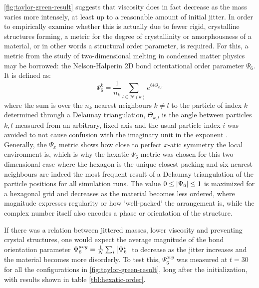 \begin{samepage}


  \autoref{fig:taylor-green-result} suggests that viscosity does in fact decrease as the mass varies more intensely, at least up to a reasonable amount of initial jitter.
  In order to empirically examine whether this is actually due to fewer rigid, crystalline structures forming, a metric for the degree of crystallinity or amorphousness of a material, or in other words a structural order parameter, is required. For this, a metric from the study of two-dimensional melting in condensed matter physics may be borrowed: the Nelson-Halperin 2D bond orientational order parameter\autocite*{bond-orientational-parameter-pis-6} $\Psi_6$. It is defined as\autocite{nature-psi-6-bond-orientational}:
  \begin{equation}
    \Psi_6^k = \frac{1}{n_k} \sum_{l\in\mathcal{N}(k)}e^{6i\Theta_{k,l}}
  \end{equation}
  where the sum is over the $n_k$ nearest neighbours $k\neq l$ to the particle of index $k$ determined through a Delaunay triangulation, $\Theta_{k,l}$ is the angle between particles $k,l$ measured from an arbitrary, fixed axis and the usual particle index $i$ was avoided to not cause confusion with the imaginary unit in the exponent \autocite*{nature-psi-6-bond-orientational}. Generally, the $\Psi_x$ metric shows how close to perfect $x$-atic symmetry the local environment is, which is why the hexatic $\Psi_6$ metric was chosen for this two-dimensional case where the hexagon is the unique closest packing and six nearest neighbours are indeed the most frequent result of a Delaunay triangulation of the particle positions for all simulation runs. The value $0 \leq \left|\Psi_6\right| \leq 1$ is maximized for a hexagonal grid and decreases as the material becomes less ordered\autocite*{nature-psi-6-bond-orientational}, where magnitude expresses regularity or how 'well-packed' the arrangement is\autocite*{nicer-psi-6-bond-orientational}, while the complex number itself also encodes a phase or orientation of the structure.

  If there was a relation between jittered masses, lower viscosity and preventing crystal structures, one would expect the average magnitude of the bond orientation parameter $\Psi_6^{avg} = \frac{1}{N}\sum_i \left|\Psi_6^i\right|$ to decrease as the jitter increases and the material becomes more disorderly. To test this, $\Psi_6^{avg}$ was measured at $t=30$ for all the configurations in \autoref{fig:taylor-green-result}, long after the initialization, with results shown in table \ref{tbl:hexatic-order}.


\end{samepage}
